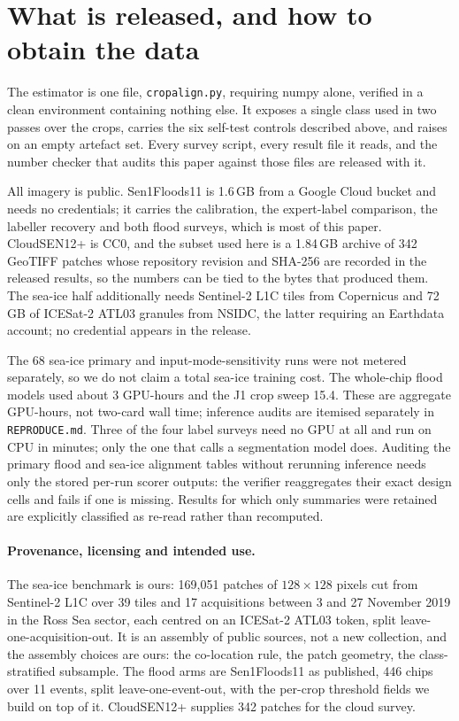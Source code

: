 \documentclass[10pt,twocolumn,letterpaper]{article}
\begin{document}
\section{What is released, and how to obtain the data}

The estimator is one file, \texttt{cropalign.py}, requiring numpy alone, verified in a
clean environment containing nothing else. It exposes a single class used in two
passes over the crops, carries the six self-test controls described above, and
raises on an empty artefact set. Every survey script,
every result file it reads, and the number checker that audits this paper against
those files are released with it.

All imagery is public. Sen1Floods11 is 1.6\,GB from a Google Cloud bucket and needs
no credentials; it carries the calibration, the expert-label comparison, the labeller
recovery and both flood surveys, which is most of this paper. CloudSEN12+ is CC0, and
the subset used here is a 1.84\,GB archive of 342 GeoTIFF patches whose repository
revision and SHA-256 are recorded in the released results, so the numbers can be tied
to the bytes that produced them. The sea-ice half additionally needs Sentinel-2 L1C
tiles from Copernicus and 72\,GB of ICESat-2 ATL03 granules from NSIDC, the latter
requiring an Earthdata account; no credential appears in the release.

The 68 sea-ice primary and input-mode-sensitivity runs were not metered separately,
so we do not claim a total sea-ice training cost. The whole-chip flood models used about 3
GPU-hours and the J1 crop sweep 15.4. These are aggregate GPU-hours, not two-card wall time; inference
audits are itemised separately in \texttt{REPRODUCE.md}. Three of the four label
surveys need no GPU at all and run on CPU in minutes; only the one that calls a
segmentation model does.
Auditing the primary flood and sea-ice alignment tables without rerunning inference
needs only the stored per-run scorer outputs: the verifier reaggregates their exact
design cells and fails if one is missing. Results for which only summaries were retained are
explicitly classified as re-read rather than recomputed.

\paragraph{Provenance, licensing and intended use.} The sea-ice benchmark is ours:
169{,}051 patches of $128 \times 128$ pixels cut from Sentinel-2 L1C over 39 tiles
and 17 acquisitions between 3 and 27 November 2019 in the Ross Sea sector, each
centred on an ICESat-2 ATL03 token, split leave-one-acquisition-out. It is an
assembly of public sources, not a new collection, and the assembly choices are ours:
the co-location rule, the patch geometry, the class-stratified subsample. The flood
arms are Sen1Floods11 as published, 446 chips over 11 events, split
leave-one-event-out, with the per-crop threshold fields we build on top of it.
CloudSEN12+ supplies 342 patches for the cloud survey.
\end{document}
